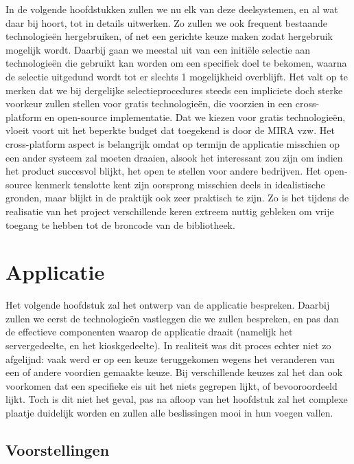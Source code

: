 In de volgende hoofdstukken zullen we nu elk van deze deelsystemen, en al wat daar bij hoort, tot in details uitwerken. Zo zullen we ook frequent bestaande technologieën hergebruiken, of net een gerichte keuze maken zodat hergebruik mogelijk wordt. Daarbij gaan we meestal uit van een initiële selectie aan technologieën die gebruikt kan worden om een specifiek doel te bekomen, waarna de selectie uitgedund wordt tot er slechts 1 mogelijkheid overblijft. Het valt op te merken dat we bij dergelijke selectieprocedures steeds een impliciete doch sterke voorkeur zullen stellen voor gratis technologieën, die voorzien in een cross-platform en open-source implementatie. Dat we kiezen voor gratis technologieën, vloeit voort uit het beperkte budget dat toegekend is door de MIRA vzw. Het cross-platform aspect is belangrijk omdat op termijn de applicatie misschien op een ander systeem zal moeten draaien, alsook het interessant zou zijn om indien het product succesvol blijkt, het open te stellen voor andere bedrijven. Het open-source kenmerk tenslotte kent zijn oorsprong misschien deels in idealistische gronden, maar blijkt in de praktijk ook zeer praktisch te zijn. Zo is het tijdens de realisatie van het project verschillende keren extreem nuttig gebleken om vrije toegang te hebben tot de broncode van de bibliotheek.


%
%

\chapter{Applicatie}
\label{ontwerp:applicatie}

Het volgende hoofdstuk zal het ontwerp van de applicatie bespreken. Daarbij zullen we eerst de technologieën vastleggen die we zullen bespreken, en pas dan de effectieve componenten waarop de applicatie draait (namelijk het servergedeelte, en het kioskgedeelte). In realiteit was dit proces echter niet zo afgelijnd: vaak werd er op een keuze teruggekomen wegens het veranderen van een of andere voordien gemaakte keuze. Bij verschillende keuzes zal het dan ook voorkomen dat een specifieke eis uit het niets gegrepen lijkt, of bevooroordeeld lijkt. Toch is dit niet het geval, pas na afloop van het hoofdstuk zal het complexe plaatje duidelijk worden en zullen alle beslissingen mooi in hun voegen vallen.

\section{Voorstellingen}
\label{ontwerp:applicatie:voorstellingen}

